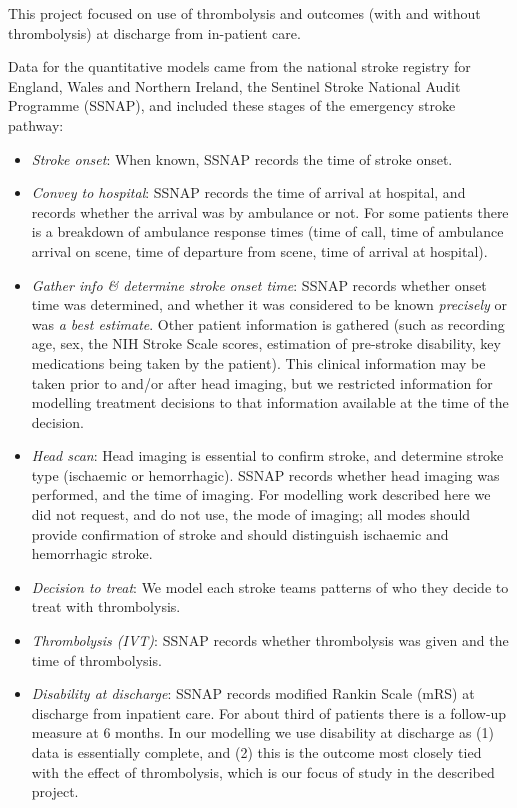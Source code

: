 This project focused on use of thrombolysis and outcomes (with and without thrombolysis) at discharge from in-patient care. 


Data for the quantitative models came from the national stroke registry for England, Wales and Northern Ireland, the Sentinel Stroke National Audit Programme (SSNAP), and included these stages of the emergency stroke pathway:

\begin{itemize}

    \item \textit{Stroke onset}: When known, SSNAP records the time of stroke onset.

    \item \textit{Convey to hospital}: SSNAP records the time of arrival at hospital, and records whether the arrival was by ambulance or not. For some patients there is a breakdown of ambulance response times (time of call, time of ambulance arrival on scene, time of departure from scene, time of arrival at hospital).

    \item \textit{Gather info \& determine stroke onset time}: SSNAP records whether onset time was determined, and whether it was considered to be known \textit{precisely} or was \textit{a best estimate}. Other patient information is gathered (such as recording age, sex, the NIH Stroke Scale scores, estimation of pre-stroke disability, key medications being taken by the patient). This clinical information may be taken prior to and/or after head imaging, but we restricted information for modelling treatment decisions to that information available at the time of the decision.

    \item \textit{Head scan}: Head imaging is essential to confirm stroke, and determine stroke type (ischaemic or hemorrhagic). SSNAP records whether head imaging was performed, and the time of imaging. For modelling work described here we did not request, and do not use, the mode of imaging; all modes should provide confirmation of stroke and should distinguish ischaemic and hemorrhagic stroke. 

    \item \textit{Decision to treat}: We model each stroke teams patterns of who they decide to treat with thrombolysis.

    \item \textit{Thrombolysis (IVT)}: SSNAP records whether thrombolysis was given and the time of thrombolysis.

    \item \textit{Disability at discharge}: SSNAP records modified Rankin Scale (mRS) at discharge from inpatient care. For about third of patients there is a follow-up measure at 6 months. In our modelling we use disability at discharge as (1) data is essentially complete, and (2) this is the outcome most closely tied with the effect of thrombolysis, which is our focus of study in the described project.

\end{itemize}



